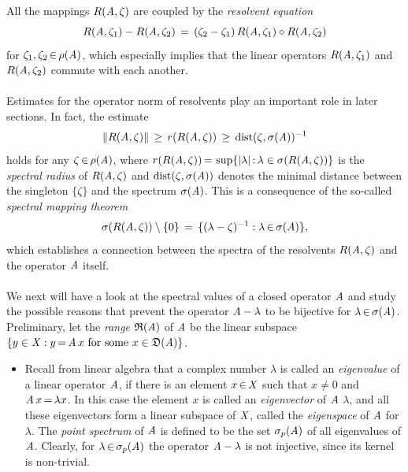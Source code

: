 \documentclass[11pt,twoside]{article}
\begin{document}
\subparagraph{} %
All the mappings $R(\mathit{A},\zeta)$ are coupled by the \textit{resolvent equation}
\begin{equation}\label{RESOLVENT_EQUATION}
R(\mathit{A},\zeta_1) - R(\mathit{A},\zeta_2)
\,=\,
(\zeta_2-\zeta_1) \, R(\mathit{A},\zeta_1) \circ R(\mathit{A},\zeta_2)
\end{equation}
for $\zeta_1,\zeta_2 {\,\in\,} \rho(\mathit{A})$,
which especially implies that
the linear operators $R(\mathit{A},\zeta_1)$ and $R(\mathit{A},\zeta_2)$
commute with each another.

\paragraph{} %
Estimates for the operator norm of resolvents play an important role
in later sections.
In fact,
the estimate
\begin{equation}\label{RESOLVENT_ESTIMATE_I}
\left\lVert R(\mathit{A},\zeta) \right\rVert \, \geq \,
r(R(\mathit{A},\zeta))     \, \geq \,
\mbox{dist}(\zeta,\sigma(\mathit{A}))^{-1}
\end{equation}
holds for any $\zeta {\,\in\,} \rho(\mathit{A})$,
where $r(R(\linA,\zeta)) \eq
\sup \{ \abs{\lambda} \: \lambda \in \sigma(R(\linA,\zeta)) \}$
is the \textit{spectral radius} of $R(\mathit{A},\zeta)$ and
$\mbox{dist}(\zeta,\sigma(\mathit{A}))$ denotes the minimal distance
between the singleton $\{\zeta\}$ and the spectrum $\sigma(\mathit{A})$.
This is a consequence of the so-called \textit{spectral mapping theorem}
\[
\sigma(R(\mathit{A},\zeta)) \setminus \{0\} \,=\,
\{(\lambda-\zeta)^{-1}: \lambda {\,\in\,} \sigma(\mathit{A})\},
\]
which establishes a connection between the spectra of the resolvents
$R(\mathit{A},\zeta)$ and the operator $\mathit{A}$ itself.

\paragraph{} %
We next will have a look at the spectral values
of a closed operator $\mathit{A}$ and study the possible reasons
that prevent the operator $\mathit{A} - \lambda$ to be bijective
for $\lambda {\,\in\,} \sigma(\mathit{A})$.
Preliminary,
let the \textit{range} $\mathfrak{R}(\mathit{A})$ of $\mathit{A}$ be the linear subspace
$\{y \in \mathit{X}: y {\,=\,} \mathit{A} \, x \mbox{ for some } x \in \mathfrak{D}(\mathit{A}) \}$.

\begin{itemize}[leftmargin=4mm,itemsep=5pt]
\item[1.]
Recall from linear algebra
that a complex number $\lambda$ is called an \textit{eigen\-value}
of a linear operator $\mathit{A}$,
if there is an element $x {\,\in\,} \mathit{X}$ such that
$x \neq 0$ and $\mathit{A} \,x {\,=\,} \lambda x$.
In this case the element $x$ is called an \textit{eigenvector} of $\mathit{A}$
{\wrt} $\lambda$,
and all these eigenvectors form a linear subspace of $\mathit{X}$,
called the \textit{eigenspace} of $\mathit{A}$ for $\lambda$.
The \textit{point spectrum} of $\mathit{A}$ is defined to be
the set $\sigma_p(\mathit{A})$ of all eigen\-values of $\mathit{A}$.
Clearly,
for $\lambda {\,\in\,} \sigma_p(\mathit{A})$ the operator
$\mathit{A} - \lambda$ is not injective,
since its kernel is non-trivial.
\end{itemize}
\end{document}
